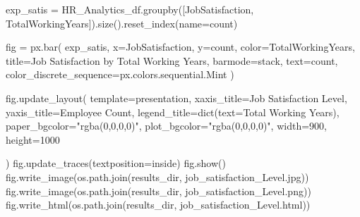 \documentclass[
  letterpaper,
  DIV=11,
  numbers=noendperiod]{scrartcl}
\newenvironment{Shaded}{\begin{snugshade}}{\end{snugshade}}
\newcommand{\BuiltInTok}[1]{\textcolor[rgb]{0.00,0.23,0.31}{#1}}
\newcommand{\DecValTok}[1]{\textcolor[rgb]{0.68,0.00,0.00}{#1}}
\newcommand{\NormalTok}[1]{\textcolor[rgb]{0.00,0.23,0.31}{#1}}
\newcommand{\OperatorTok}[1]{\textcolor[rgb]{0.37,0.37,0.37}{#1}}
\newcommand{\StringTok}[1]{\textcolor[rgb]{0.13,0.47,0.30}{#1}}
\begin{document}
\begin{Shaded}
\begin{Highlighting}[]
\NormalTok{exp\_satis }\OperatorTok{=}\NormalTok{ HR\_Analytics\_df.groupby([}\StringTok{\textquotesingle{}JobSatisfaction\textquotesingle{}}\NormalTok{, }\StringTok{\textquotesingle{}TotalWorkingYears\textquotesingle{}}\NormalTok{]).size().reset\_index(name}\OperatorTok{=}\StringTok{\textquotesingle{}count\textquotesingle{}}\NormalTok{)}

\NormalTok{fig }\OperatorTok{=}\NormalTok{ px.bar(}
\NormalTok{    exp\_satis,}
\NormalTok{    x}\OperatorTok{=}\StringTok{\textquotesingle{}JobSatisfaction\textquotesingle{}}\NormalTok{,}
\NormalTok{    y}\OperatorTok{=}\StringTok{\textquotesingle{}count\textquotesingle{}}\NormalTok{,}
\NormalTok{    color}\OperatorTok{=}\StringTok{\textquotesingle{}TotalWorkingYears\textquotesingle{}}\NormalTok{,}
\NormalTok{    title}\OperatorTok{=}\StringTok{\textquotesingle{}Job Satisfaction by Total Working Years\textquotesingle{}}\NormalTok{,}
\NormalTok{    barmode}\OperatorTok{=}\StringTok{\textquotesingle{}stack\textquotesingle{}}\NormalTok{,}
\NormalTok{    text}\OperatorTok{=}\StringTok{\textquotesingle{}count\textquotesingle{}}\NormalTok{,}
\NormalTok{    color\_discrete\_sequence}\OperatorTok{=}\NormalTok{px.colors.sequential.Mint}
\NormalTok{)}

\NormalTok{fig.update\_layout(}
\NormalTok{    template}\OperatorTok{=}\StringTok{\textquotesingle{}presentation\textquotesingle{}}\NormalTok{,}
\NormalTok{    xaxis\_title}\OperatorTok{=}\StringTok{\textquotesingle{}Job Satisfaction Level\textquotesingle{}}\NormalTok{,}
\NormalTok{    yaxis\_title}\OperatorTok{=}\StringTok{\textquotesingle{}Employee Count\textquotesingle{}}\NormalTok{,}
\NormalTok{    legend\_title}\OperatorTok{=}\BuiltInTok{dict}\NormalTok{(text}\OperatorTok{=}\StringTok{\textquotesingle{}Total Working Years\textquotesingle{}}\NormalTok{),}
\NormalTok{    paper\_bgcolor}\OperatorTok{=}\StringTok{"rgba(0,0,0,0)"}\NormalTok{,}
\NormalTok{    plot\_bgcolor}\OperatorTok{=}\StringTok{"rgba(0,0,0,0)"}\NormalTok{,}
\NormalTok{     width}\OperatorTok{=}\DecValTok{900}\NormalTok{,   }
\NormalTok{    height}\OperatorTok{=}\DecValTok{1000}
    
\NormalTok{)}
\NormalTok{fig.update\_traces(textposition}\OperatorTok{=}\StringTok{\textquotesingle{}inside\textquotesingle{}}\NormalTok{)}
\NormalTok{fig.show()}
\NormalTok{fig.write\_image(os.path.join(results\_dir, }\StringTok{\textquotesingle{}job\_satisfaction\_Level.jpg\textquotesingle{}}\NormalTok{))}
\NormalTok{fig.write\_image(os.path.join(results\_dir, }\StringTok{\textquotesingle{}job\_satisfaction\_Level.png\textquotesingle{}}\NormalTok{))}
\NormalTok{fig.write\_html(os.path.join(results\_dir, }\StringTok{\textquotesingle{}job\_satisfaction\_Level.html\textquotesingle{}}\NormalTok{))}
\end{Highlighting}
\end{Shaded}
\end{document}

